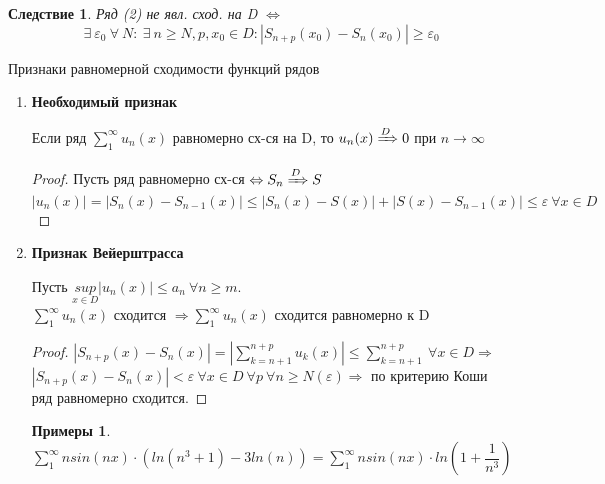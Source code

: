 \documentclass[a4paper, 12pt]{article}
\newtheorem{Examples}{Примеры}
\newtheorem{Consequence}{Следствие}
\begin{document}
    \begin{Consequence}
        Ряд (2) не явл. сход. на D $\Leftrightarrow$ \\
        \[\ \exists \  \varepsilon_0 \ \forall \ N: \ \exists \  n \ge N,
        p, x_0 \in D:
        \left| S_{n + p}(x_0) - S_n(x_0)\right| \ge \varepsilon_0\]
    \end{Consequence}

    \newpage
    Признаки равномерной сходимости функций рядов
    \begin{enumerate}
        \item 
        \textbf{Необходимый признак}
        
        Если ряд $\displaystyle \sum^{\infty}_{1} u_n(x)$ равномерно сх-ся на D,
        то $u_n(x) \xRightarrow{D} 0$ при $n \rightarrow \infty$

        \begin{proof}
            Пусть ряд равномерно сх-ся $\Leftrightarrow S_n \xRightarrow{D} S$\\
            $\left| u_n(x) \right| = \left| S_n(x) - S_{n - 1}(x)\right|
            \le \left| S_n(x) - S(x)\right| + \left| S(x) - S_{n - 1}(x)\right|
            \le \varepsilon \ \forall x \in D$     
        \end{proof} 
        \item
        \textbf{Признак Вейерштрасса}

        Пусть $\underset{x \in D}{sup} \left| u_n(x)\right| \le a_n
        \ \forall n \ge m.$\\
        $\displaystyle \sum^{\infty}_{1} u_n(x)$ сходится $\Rightarrow \displaystyle
        \sum^{\infty}_{1} u_n(x)$ сходится равномерно к D

        \begin{proof}
            $\left| S_{n + p}(x) - S_n(x)\right| = \left| \displaystyle
            \sum^{n + p}_{k = n + 1} u_k(x) \right| \le \displaystyle
            \sum^{n + p}_{k = n + 1} \ \forall x \in D \Rightarrow$\\
            $\left| S_{n + p}(x) - S_n(x) \right| < \varepsilon \ \forall x
            \in D \ \forall p \ \forall n \ge N(\varepsilon) \Rightarrow$
            по критерию Коши ряд равномерно сходится.
        \end{proof}
        \begin{Examples}
            $\displaystyle \sum^{\infty}_{1} nsin(nx) \cdot
            (ln(n^3 + 1) - 3ln(n)) = \displaystyle \sum^{\infty}_{1} nsin(nx)
            \cdot ln(1 + \dfrac{1}{n^3})$
        \end{Examples}


\end{enumerate}
\end{document}
